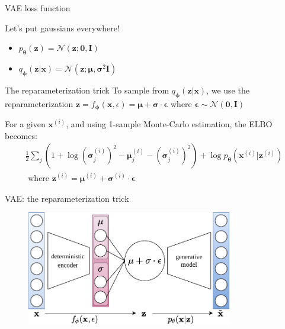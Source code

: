 \documentclass{beamer}
\begin{document}
  \begin{frame}{VAE loss function}

  
    Let's put gaussians everywhere!
    \begin{itemize}
      \item $p_{\boldsymbol{\theta}}(\mathbf{z}) = \mathcal{N}(\mathbf{z}; \mathbf{0}, \mathbf{I})$
      \item $q_{\boldsymbol{\phi}}(\mathbf{z}|\mathbf{x}) = \mathcal{N}(\mathbf{z}; \boldsymbol{\mu}, \boldsymbol{\sigma}^2\mathbf{I})$
    \end{itemize}

    \begin{block}{The reparameterization trick}
      To sample from $q_{\boldsymbol{\phi}}(\mathbf{z}|\mathbf{x})$, we use the reparameterization $\mathbf{z} = f_{\boldsymbol{\phi}}(\mathbf{x}, \epsilon) = \boldsymbol{\mu} + \boldsymbol{\sigma} \cdot \boldsymbol{\epsilon}$ where $\boldsymbol{\epsilon} \sim \mathcal{N}(\mathbf{0}, \mathbf{I})$
    \end{block}

    \small{For a given $\mathbf{x}^{(i)}$, and using 1-sample Monte-Carlo estimation, the ELBO becomes:}
    \vspace{0cm}
    \begin{multline*}
      \frac{1}{2} \sum_j \left(1 + \log (\boldsymbol{\sigma}^{(i)}_j)^2 - \boldsymbol{\mu}^{(i)}_j - (\boldsymbol{\sigma}^{(i)}_j)^2 \right) + \log p_{\boldsymbol{\theta}}(\mathbf{x}^{(i)}|\mathbf{z}^{(i)})\\
      \text{ where } \mathbf{z}^{(i)} = \boldsymbol{\mu}^{(i)} + \boldsymbol{\sigma}^{(i)} \cdot \boldsymbol{\epsilon}
    \end{multline*}

  \end{frame}

  \begin{frame}{VAE: the reparameterization trick}

    \begin{figure}
      \includegraphics[width=9cm]{rc/vae-reparameterization}
    \end{figure}
    
  \end{frame}
\end{document}
